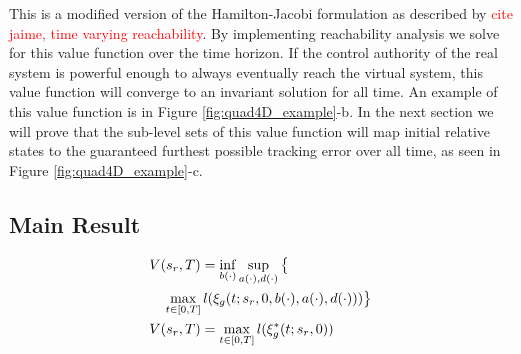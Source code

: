  This is a modified version of the Hamilton-Jacobi formulation as described by \textcolor{red}{cite jaime, time varying reachability}. By implementing reachability analysis we solve for this value function over the time horizon. If the control authority of the real system is powerful enough to always eventually reach the virtual system, this value function will converge to an invariant solution for all time.  An example of this value function is in Figure \ref{fig:quad4D_example}-b. In the next section we will prove that the sub-level sets of this value function will map initial relative states to the guaranteed furthest possible tracking error over all time, as seen in Figure \ref{fig:quad4D_example}-c.
 
\subsection{Main Result}
 \begin{equation}
 \begin{aligned}
& V(s_r, T) = \inf_{b(\cdot)} \sup_{a(\cdot), d(\cdot)} \big\{\\
&\quad \max_{t \in [0, T]} l(\xi_g(t; s_r, 0, b(\cdot), a(\cdot), d(\cdot)))\big\} \\
& V(s_r, T) = \max_{t \in [0, T]} l(\xi_g^*(t; s_r, 0)) 
 \end{aligned}
  \end{equation}
 
